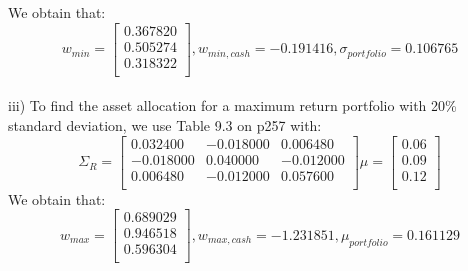 \documentclass{article}
\begin{document}
We obtain that:
\begin{equation*}
w_{min} = %
\begin{bmatrix}{}
 0.367820 \\ 
  0.505274 \\ 
  0.318322 \\ 
  \end{bmatrix},
w_{min,cash} = -0.191416,
\sigma_{portfolio} = 0.106765
\end{equation*}  
\vspace{5mm} \\
%
iii) To find the asset allocation for a maximum return portfolio with 20\% standard deviation, we use Table 9.3 on p257 with:
\begin{equation*}
\Sigma_{R}=%
\begin{bmatrix}{}
 0.032400 & -0.018000 & 0.006480 \\ 
  -0.018000 & 0.040000 & -0.012000 \\ 
  0.006480 & -0.012000 & 0.057600 \\ 
  \end{bmatrix}
 \mu = \begin{bmatrix}{} 
0.06 \\
0.09 \\
0.12 \\
  \end{bmatrix}
\end{equation*}
We obtain that:
\begin{equation*}
w_{max} =%
\begin{bmatrix}{}
 0.689029 \\ 
  0.946518 \\ 
  0.596304 \\ 
  \end{bmatrix},
w_{max,cash} = -1.231851,
\mu_{portfolio} = 0.161129
\end{equation*}  
\end{document}

